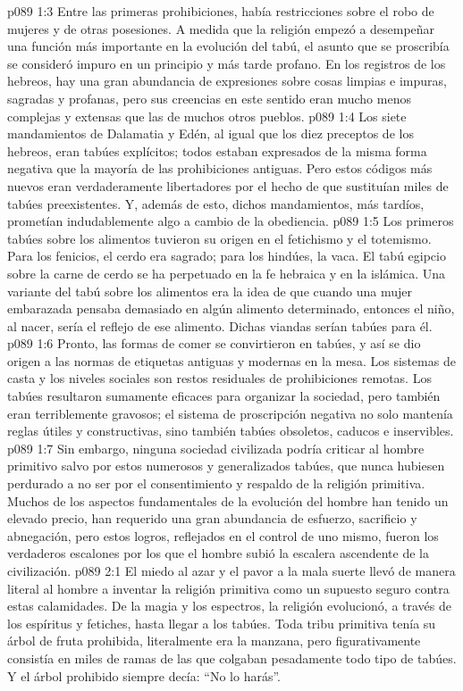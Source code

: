\vs p089 1:3 Entre las primeras prohibiciones, había restricciones sobre el robo de mujeres y de otras posesiones. A medida que la religión empezó a desempeñar una función más importante en la evolución del tabú, el asunto que se proscribía se consideró impuro en un principio y más tarde profano. En los registros de los hebreos, hay una gran abundancia de expresiones sobre cosas limpias e impuras, sagradas y profanas, pero sus creencias en este sentido eran mucho menos complejas y extensas que las de muchos otros pueblos.
\vs p089 1:4 Los siete mandamientos de Dalamatia y Edén, al igual que los diez preceptos de los hebreos, eran tabúes explícitos; todos estaban expresados de la misma forma negativa que la mayoría de las prohibiciones antiguas. Pero estos códigos más nuevos eran verdaderamente libertadores por el hecho de que sustituían miles de tabúes preexistentes. Y, además de esto, dichos mandamientos, más tardíos, prometían indudablemente algo a cambio de la obediencia.
\vs p089 1:5 Los primeros tabúes sobre los alimentos tuvieron su origen en el fetichismo y el totemismo. Para los fenicios, el cerdo era sagrado; para los hindúes, la vaca. El tabú egipcio sobre la carne de cerdo se ha perpetuado en la fe hebraica y en la islámica. Una variante del tabú sobre los alimentos era la idea de que cuando una mujer embarazada pensaba demasiado en algún alimento determinado, entonces el niño, al nacer, sería el reflejo de ese alimento. Dichas viandas serían tabúes para él.
\vs p089 1:6 Pronto, las formas de comer se convirtieron en tabúes, y así se dio origen a las normas de etiquetas antiguas y modernas en la mesa. Los sistemas de casta y los niveles sociales son restos residuales de prohibiciones remotas. Los tabúes resultaron sumamente eficaces para organizar la sociedad, pero también eran terriblemente gravosos; el sistema de proscripción negativa no solo mantenía reglas útiles y constructivas, sino también tabúes obsoletos, caducos e inservibles.
\vs p089 1:7 Sin embargo, ninguna sociedad civilizada podría criticar al hombre primitivo salvo por estos numerosos y generalizados tabúes, que nunca hubiesen perdurado a no ser por el consentimiento y respaldo de la religión primitiva. Muchos de los aspectos fundamentales de la evolución del hombre han tenido un elevado precio, han requerido una gran abundancia de esfuerzo, sacrificio y abnegación, pero estos logros, reflejados en el control de uno mismo, fueron los verdaderos escalones por los que el hombre subió la escalera ascendente de la civilización.
\vs p089 2:1 El miedo al azar y el pavor a la mala suerte llevó de manera literal al hombre a inventar la religión primitiva como un supuesto seguro contra estas calamidades. De la magia y los espectros, la religión evolucionó, a través de los espíritus y fetiches, hasta llegar a los tabúes. Toda tribu primitiva tenía su árbol de fruta prohibida, literalmente era la manzana, pero figurativamente consistía en miles de ramas de las que colgaban pesadamente todo tipo de tabúes. Y el árbol prohibido siempre decía: “No lo harás”.
